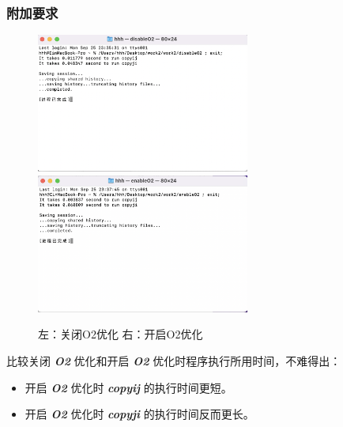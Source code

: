             \subsubsection*{附加要求}
                \begin{figure}[htbp]
                    \centering
                    \includegraphics*[width = 7cm]{work2_s3.png}
                    \includegraphics*[width = 7cm]{work2_s4.png}
                    \caption{左：关闭O2优化 右：开启O2优化}
                \end{figure}
                \par 比较关闭 \textbf{\textit{O2}} 优化和开启 \textbf{\textit{O2}} 优化时程序执行所用时间，不难得出：
                \begin{itemize}
                    \item 开启 \textbf{\textit{O2}} 优化时 \textbf{\textit{copyij}} 的执行时间更短。
                    \item 开启 \textbf{\textit{O2}} 优化时 \textbf{\textit{copyji}} 的执行时间反而更长。
                \end{itemize}
        \newpage

